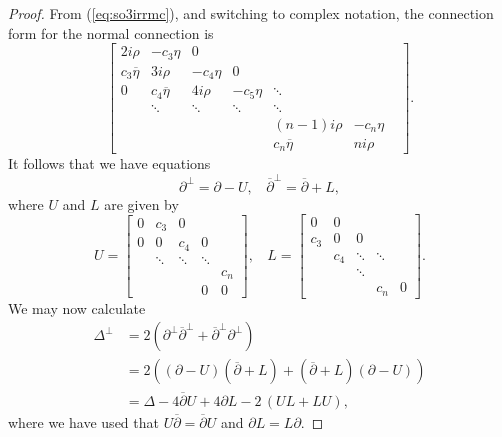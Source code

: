 \documentclass[11pt]{article}
\theoremstyle{definition}
\numberwithin{equation}{section}
\begin{document}
\begin{proof}
    From (\ref{eq:so3irrmc}), and switching to complex notation, the connection form for the normal connection is
    \begin{equation*}
        \begin{bmatrix}
           2 i \rho & - c_3 \eta & 0 & & & & \\
            c_3 \overline{\eta} & 3 i \rho & - c_4 \eta & 0 & & & \\
            0 & c_4 \overline{\eta} & 4 i \rho  & -c_5 \eta & \ddots  & &  \\
             & \ddots & \ddots & \ddots & \ddots & & \\
             & & & & (n-1)i \rho & -c_n {\eta} \\
             & & & & c_n \overline{\eta} & n i \rho
        \end{bmatrix}.
    \end{equation*}
    It follows that we have equations
    \begin{equation*}
        \partial^{\perp} = \partial - U, \:\:\:\: \overline{\partial}^\perp = \overline{\partial} + L,
    \end{equation*}
    where $U$ and $L$ are given by
    \begin{equation*}
        U = \begin{bmatrix}
            0 & c_3 & 0 & & \\
            0 & 0 & c_4 & 0 & \\
             & \ddots & \ddots & \ddots & \\
             & & & & c_n \\
             & & & 0 & 0
        \end{bmatrix}, \:\:\:\: L = \begin{bmatrix}
            0 & 0 &  & & \\
            c_3 & 0 & 0 &  & \\
             & c_4 & \ddots & \ddots & \\
             & & \ddots & & \\
             & & & c_n & 0
        \end{bmatrix}.
    \end{equation*} 
We may now calculate
    \begin{align*}
        \Delta^\perp & = 2 \left( \partial^\perp \overline{\partial}^\perp + \overline{\partial}^\perp \partial^\perp \right) \\
        & = 2 \left( (\partial - U)(\overline{\partial} + L) + (\overline{\partial} + L)(\partial - U)  \right) \\
        & = \Delta - 4  \overline{\partial}U + 4  \partial L - 2 \, (UL + LU),
    \end{align*}
where we have used that $U\overline{\partial} = \overline{\partial} U$ and $\partial L = L \partial$.
\end{proof}
\end{document}

